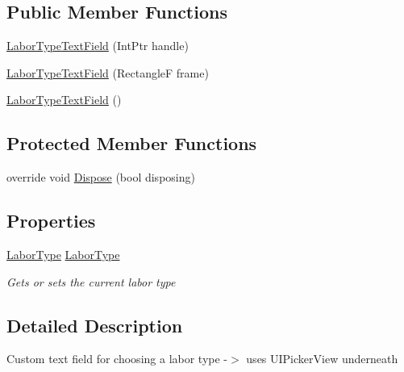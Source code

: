 \subsection*{Public Member Functions}
\begin{DoxyCompactItemize}
\item 
\hyperlink{class_field_service_1_1i_o_s_1_1_labor_type_text_field_a90fd479edc36f53c20b4beaba0f4965a}{Labor\+Type\+Text\+Field} (Int\+Ptr handle)
\item 
\hyperlink{class_field_service_1_1i_o_s_1_1_labor_type_text_field_a03572dddfa1e9d5ddb53ad2d63b93b51}{Labor\+Type\+Text\+Field} (Rectangle\+F frame)
\item 
\hyperlink{class_field_service_1_1i_o_s_1_1_labor_type_text_field_ac6020310be78db5f927753692efd3a4f}{Labor\+Type\+Text\+Field} ()
\end{DoxyCompactItemize}
\subsection*{Protected Member Functions}
\begin{DoxyCompactItemize}
\item 
override void \hyperlink{class_field_service_1_1i_o_s_1_1_labor_type_text_field_ab6f8c6945e387169d8d69309c63ca2ce}{Dispose} (bool disposing)
\end{DoxyCompactItemize}
\subsection*{Properties}
\begin{DoxyCompactItemize}
\item 
\hyperlink{namespace_field_service_1_1_data_a20c89d9b67c465f840b3ef27a026afd6}{Labor\+Type} \hyperlink{class_field_service_1_1i_o_s_1_1_labor_type_text_field_ad1d3384d1d8d6d01798f89aee1bc4cb8}{Labor\+Type}
\begin{DoxyCompactList}\small\item\em Gets or sets the current labor type \end{DoxyCompactList}\end{DoxyCompactItemize}


\subsection{Detailed Description}
Custom text field for choosing a labor type -\/$>$ uses U\+I\+Picker\+View underneath 



